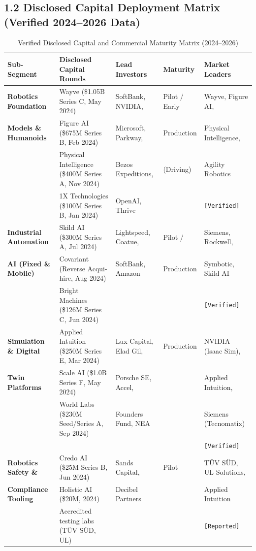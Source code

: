 \documentclass[11pt,a4paper]{article}
\begin{document}
\subsection{1.2 Disclosed Capital Deployment Matrix (Verified 2024--2026 Data)}
\begin{table}[h!]
\centering
\small
\begin{tabularx}{\textwidth}{@{}l p{4.2cm} p{3.2cm} l X@{}}
\toprule
\textbf{Sub-Segment} & \textbf{Disclosed Capital Rounds} & \textbf{Lead Investors} & \textbf{Maturity} & \textbf{Market Leaders} \\
\midrule
\textbf{Robotics Foundation} & Wayve (\$1.05B Series C, May 2024)\newline & SoftBank, NVIDIA, & Pilot / Early & Wayve, Figure AI, \\
\textbf{Models \& Humanoids} & Figure AI (\$675M Series B, Feb 2024)\newline & Microsoft, Parkway, & Production & Physical Intelligence, \\
& Physical Intelligence (\$400M Series A, Nov 2024)\newline & Bezos Expeditions, & (Driving) & Agility Robotics \\
& 1X Technologies (\$100M Series B, Jan 2024) & OpenAI, Thrive & & \texttt{[Verified]} \\
\addlinespace
\textbf{Industrial Automation} & Skild AI (\$300M Series A, Jul 2024)\newline & Lightspeed, Coatue, & Pilot / & Siemens, Rockwell, \\
\textbf{AI (Fixed \& Mobile)} & Covariant (Reverse Acqui-hire, Aug 2024)\newline & SoftBank, Amazon & Production & Symbotic, Skild AI \\
& Bright Machines (\$126M Series C, Jun 2024) & & & \texttt{[Verified]} \\
\addlinespace
\textbf{Simulation \& Digital} & Applied Intuition (\$250M Series E, Mar 2024)\newline & Lux Capital, Elad Gil, & Production & NVIDIA (Isaac Sim), \\
\textbf{Twin Platforms} & Scale AI (\$1.0B Series F, May 2024)\newline & Porsche SE, Accel, & & Applied Intuition, \\
& World Labs (\$230M Seed/Series A, Sep 2024) & Founders Fund, NEA & & Siemens (Tecnomatix) \\
& & & & \texttt{[Verified]} \\
\addlinespace
\textbf{Robotics Safety \&} & Credo AI (\$25M Series B, Jun 2024)\newline & Sands Capital, & Pilot & TÜV SÜD, UL Solutions, \\
\textbf{Compliance Tooling} & Holistic AI (\$20M, 2024)\newline & Decibel Partners & & Applied Intuition \\
& Accredited testing labs (TÜV SÜD, UL) & & & \texttt{[Reported]} \\
\bottomrule
\end{tabularx}
\caption{Verified Disclosed Capital and Commercial Maturity Matrix (2024--2026)}
\end{table}
\end{document}
